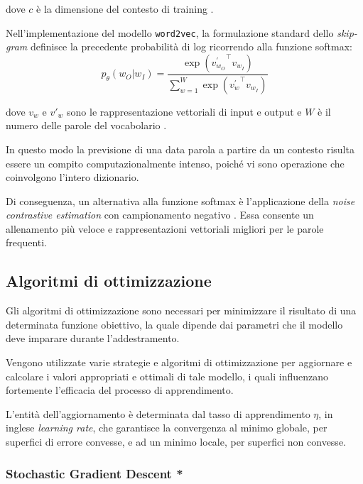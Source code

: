 dove $c$ è la dimensione del contesto di training \cite{mikolov2013distributed}. 

Nell'implementazione del modello \texttt{word2vec}, la formulazione standard dello \emph{skip-gram} definisce la precedente probabilità di log ricorrendo alla funzione softmax:
\begin{equation}
p_{\theta}(w_{O} | w_{I}) = \frac{\exp({v^{\prime}_{w_{O}}}^{\top} v_{w_{I}})}{\sum_{w=1}^{W} \exp({v^{\prime}_{w}}^{\top} v_{w_I})}
\end{equation}

dove $v_w$ e $v'_w$ sono le rappresentazione vettoriali di input e output e $W$ è il numero delle parole del vocabolario \cite{dyer2014notes}.

In questo modo la previsione di una data parola a partire da un contesto risulta essere un compito computazionalmente intenso, poiché vi sono operazione che coinvolgono l'intero dizionario.

Di conseguenza, un alternativa alla funzione softmax è l'applicazione della \emph{noise contrastive estimation} con campionamento negativo \cite{liu2016classification, viswesvaran2000measurement}. Essa consente un allenamento più veloce e rappresentazioni vettoriali migliori per le parole frequenti.

\subsection{Algoritmi di ottimizzazione}
\label{subsec:optimizer}

Gli algoritmi di ottimizzazione sono necessari per minimizzare il risultato di una determinata funzione obiettivo, la quale dipende dai parametri che il modello deve imparare durante l'addestramento. 

Vengono utilizzate varie strategie e algoritmi di ottimizzazione per aggiornare e calcolare i valori appropriati e ottimali di tale modello, i quali influenzano fortemente l'efficacia del processo di apprendimento.

L'entità dell'aggiornamento è determinata dal tasso di apprendimento $\eta$, in inglese \emph{learning rate}, che garantisce la convergenza al minimo globale, per superfici di errore convesse, e ad un minimo locale, per superfici non convesse. 

\subsubsection{Stochastic Gradient Descent *}
\label{subsubsec:SGD}

